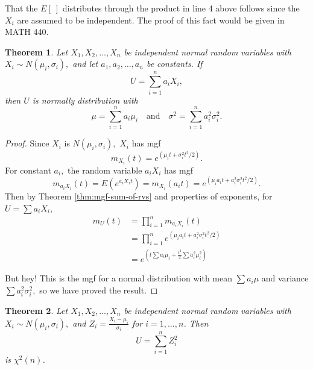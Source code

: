 \documentclass[
]{book}
\newtheorem{theorem}{Theorem}[chapter]
\theoremstyle{definition}
\theoremstyle{definition}
\theoremstyle{definition}
\theoremstyle{definition}
\theoremstyle{remark}
\begin{document}
That the \(E[~]\) distributes through the product in line 4 above follows since the \(X_i\) are assumed to be independent. The proof of this fact would be given in MATH 440.

\begin{theorem}
\protect\hypertarget{thm:sum-of-normal-rvs}{}\label{thm:sum-of-normal-rvs}Let \(X_1, X_2, \ldots, X_n\) be independent normal random variables with \(X_i \sim N(\mu_i, \sigma_i),\) and let \(a_1, a_2, \ldots, a_n\) be constants. If \[U = \sum_{i=1}^n a_i X_i,\] then \(U\) is normally distribution with \[\mu = \sum_{i=1}^n a_i \mu_i ~~~ \text{ and } ~~~ \sigma^2 = \sum_{i=1}^n a_i^2 \sigma_i^2.\]
\end{theorem}

\begin{proof}
Since \(X_i\) is \(N(\mu_i,\sigma_i),\) \(X_i\) has mgf \[m_{X_i}(t) = e^{\left(\mu_it + \sigma_i^2t^2/2\right)}.\] For constant \(a_i,\) the random variable \(a_iX_i\) has mgf \[m_{a_iX_i}(t) =E(e^{a_iX_it}) = m_{X_i}(a_it) = e^{\left(\mu_ia_it + a_i^2\sigma_i^2t^2/2\right)}.\]
Then by Theorem \ref{thm:mgf-sum-of-rvs} and properties of exponents, for \(U = \sum a_i X_i,\)
\begin{align*}
m_U(t) &= \prod_{i=1}^n m_{a_iX_i}(t) \\
      &= \prod_{i=1}^n e^{\left(\mu_ia_it + a_i^2\sigma_i^2t^2/2\right)}\\
      &= e^{\left(t\sum a_i\mu_i + \frac{t^2}{2}\sum a_i^2\mu_i^2\right)}
\end{align*}

But hey! This is the mgf for a normal distribution with mean \(\sum a_i \mu\) and variance \(\sum a_i^2 \sigma_i^2,\) so we have proved the result.
\end{proof}

\begin{theorem}
\protect\hypertarget{thm:sum-of-squares-of-standard-normal-rvs}{}\label{thm:sum-of-squares-of-standard-normal-rvs}Let \(X_1, X_2, \ldots, X_n\) be independent normal random variables with \(X_i \sim N(\mu_i, \sigma_i),\) and \(\displaystyle Z_i = \frac{X_i - \mu_i}{\sigma_i}\) for \(i = 1, \ldots, n\). Then \[U = \sum_{i=1}^n Z_i^2\] is \(\chi^2(n)\).
\end{theorem}
\end{document}
